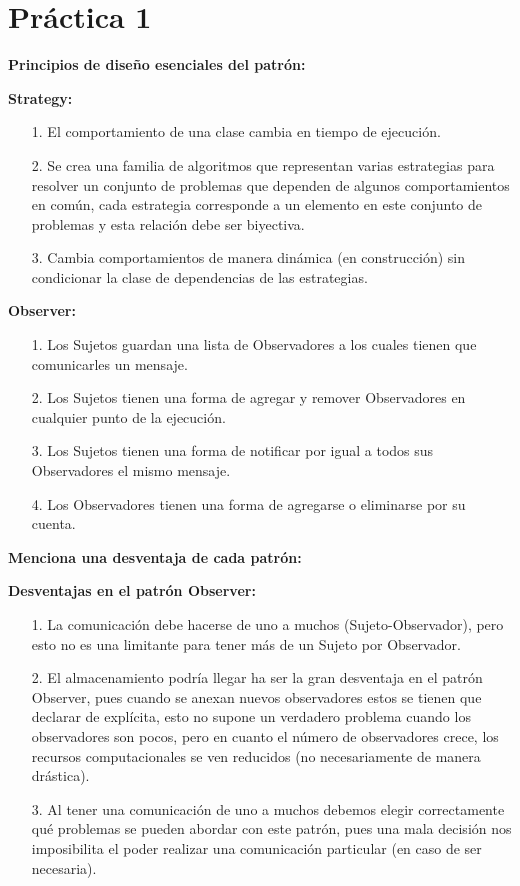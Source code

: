 \documentclass{article}
\begin{document}
	
	\section*{\LARGE{Práctica 1}}

\textbf{Principios de diseño esenciales del patrón:}

\textbf{Strategy:}

\begin{itemize}
\item[1.] El comportamiento de una clase cambia en tiempo de ejecución.
\item[2.] Se crea una familia de algoritmos que representan varias estrategias para resolver un conjunto de problemas que dependen de algunos comportamientos en común, cada estrategia corresponde a un elemento en este conjunto de problemas y esta relación debe ser biyectiva.
\item[3.] Cambia comportamientos de manera dinámica (en construcción) sin condicionar la clase de dependencias de las estrategias.
\end{itemize}

\textbf{Observer:}

\begin{itemize}
\item[1.] Los Sujetos guardan una lista de Observadores a los cuales tienen que comunicarles un mensaje.
\item[2.] Los Sujetos tienen una forma de agregar y remover Observadores en cualquier punto de la ejecución.
\item[3.] Los Sujetos tienen una forma de notificar por igual a todos sus Observadores el mismo mensaje.
\item[4.] Los Observadores tienen una forma de agregarse o eliminarse por su cuenta.
\end{itemize}

\textbf{Menciona una desventaja de cada patrón:}

\textbf{Desventajas en el patrón Observer:}
\begin{itemize}
\item[1.] La comunicación debe hacerse de uno a muchos (Sujeto-Observador), pero esto no es una limitante para tener más de un Sujeto por Observador.
\item[2.] El almacenamiento podría llegar ha ser la gran desventaja en el patrón Observer, pues cuando se anexan nuevos observadores estos se tienen que declarar de explícita, esto no supone un verdadero problema cuando los observadores son pocos, pero en cuanto el número de observadores crece, los recursos computacionales se ven reducidos (no necesariamente de manera drástica).
\item[3.] Al tener una comunicación de uno a muchos debemos elegir correctamente qué problemas se pueden abordar con este patrón, pues una mala decisión nos imposibilita el poder realizar una comunicación particular (en caso de ser necesaria).
\end{itemize}
\end{document}
